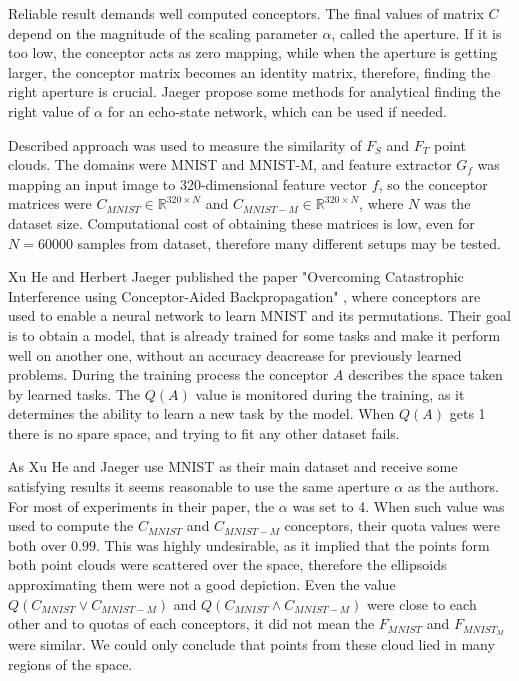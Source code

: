 \documentclass{article}
\begin{document}
\par
Reliable result demands well computed conceptors. The final values of matrix $C$ depend on the magnitude of the scaling parameter $\alpha$, called the aperture. If it is too low, the conceptor acts as zero mapping, while when the aperture is getting larger, the conceptor matrix becomes an identity matrix, therefore, finding the right aperture is crucial. Jaeger propose some methods for analytical finding the right value of $\alpha$ \cite{conc} for an echo-state network, which can be used if needed.
\par
Described approach was used to measure the similarity of $F_{S}$ and $F_{T}$ point clouds. The domains were MNIST and MNIST-M, and feature extractor $G_{f}$ was mapping an input image to 320-dimensional feature vector $f$, so the conceptor matrices were $C_{MNIST} \in \mathbb{R}^{320\times N}$ and $C_{MNIST-M} \in \mathbb{R}^{320\times N}$, where $N$ was the dataset size. Computational cost of obtaining these matrices is low, even for $N=60000$ samples from dataset, therefore many different setups may be tested.
\par
Xu He and Herbert Jaeger published the paper "Overcoming Catastrophic Interference using Conceptor-Aided Backpropagation" \cite{overc}, where conceptors are used to enable a neural network to learn MNIST and its permutations. Their goal is to obtain a model, that is already trained for some tasks and make it perform well on another one, without an accuracy deacrease for previously learned problems. During the training process the conceptor $A$ describes the space taken by learned tasks. The $Q(A)$ value is monitored during the training, as it determines the ability to learn a new task by the model. When $Q(A)$ gets 1 there is no spare space, and trying to fit any other dataset fails. 
\par
As Xu He and Jaeger use MNIST as their main dataset and receive some satisfying results it seems reasonable to use the same aperture $\alpha$ as the authors. For most of experiments in their paper, the $\alpha$ was set to 4. When such value was used to compute the $C_{MNIST}$ and $C_{MNIST-M}$ conceptors, their quota values were both over $0.99$. This was highly undesirable, as it implied that the points form both point clouds were scattered over the space, therefore the ellipsoids approximating them were not a good depiction. Even the value $Q(C_{MNIST} \vee C_{MNIST-M} )$ and $Q(C_{MNIST} \wedge C_{MNIST-M} )$ were close to each other and to quotas of each conceptors, it did not mean the $F_{MNIST}$ and $F_{MNIST_M}$ were similar. We could only conclude that points from these cloud lied in many regions of the space. 
\end{document}
